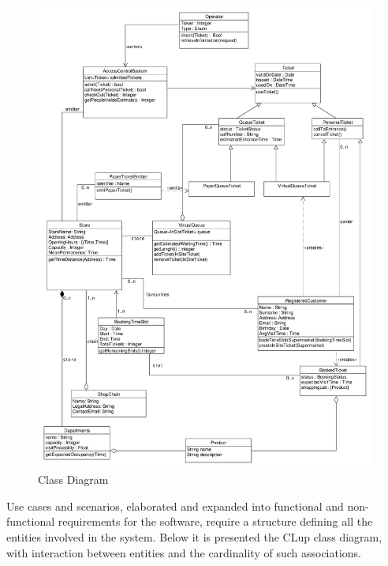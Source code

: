 \begin{figure}[ht]
    \centering
    \includegraphics[width=\textwidth]{Images/UML_class.pdf}
    \caption{\label{fig:Booked_Ticket_State}Class Diagram}
\end{figure}

Use cases and scenarios, elaborated and expanded into functional and non-functional requirements for the software, require a structure defining all the entities involved in the system.
Below it is presented the CLup class diagram, with interaction between entities and the cardinality of such associations.

\vfill
